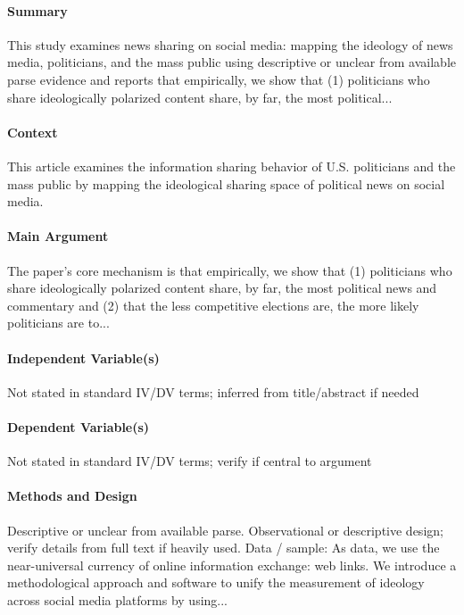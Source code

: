 \documentclass[12pt]{article}
\begin{document}
\paragraph{Summary} This study examines news sharing on social media: mapping the ideology of news media, politicians, and the mass public using descriptive or unclear from available parse evidence and reports that empirically, we show that (1) politicians who share ideologically polarized content share, by far, the most political...

\paragraph{Context} This article examines the information sharing behavior of U.S. politicians and the mass public by mapping the ideological sharing space of political news on social media.

\paragraph{Main Argument} The paper's core mechanism is that empirically, we show that (1) politicians who share ideologically polarized content share, by far, the most political news and commentary and (2) that the less competitive elections are, the more likely politicians are to...

\paragraph{Independent Variable(s)} Not stated in standard IV/DV terms; inferred from title/abstract if needed

\paragraph{Dependent Variable(s)} Not stated in standard IV/DV terms; verify if central to argument

\paragraph{Methods and Design} Descriptive or unclear from available parse. Observational or descriptive design; verify details from full text if heavily used. Data / sample: As data, we use the near-universal currency of online information exchange: web links. We introduce a methodological approach and software to unify the measurement of ideology across social media platforms by using...
\end{document}
